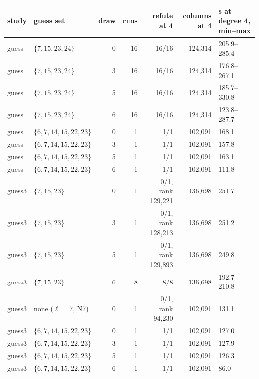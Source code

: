 \begin{tabular}{@{}llrrrrl@{}}
\toprule
study & guess set & draw & runs & refute at 4 & columns at 4 & s at degree 4, min--max \\
\midrule
guess & $\{7,15,23,24\}$ & 0 & 16 & 16/16 & 124{,}314 & 205.9--285.4 \\
guess & $\{7,15,23,24\}$ & 3 & 16 & 16/16 & 124{,}314 & 176.8--267.1 \\
guess & $\{7,15,23,24\}$ & 5 & 16 & 16/16 & 124{,}314 & 185.7--330.8 \\
guess & $\{7,15,23,24\}$ & 6 & 16 & 16/16 & 124{,}314 & 123.8--287.7 \\
guess & $\{6,7,14,15,22,23\}$ & 0 & 1 & 1/1 & 102{,}091 & 168.1 \\
guess & $\{6,7,14,15,22,23\}$ & 3 & 1 & 1/1 & 102{,}091 & 157.8 \\
guess & $\{6,7,14,15,22,23\}$ & 5 & 1 & 1/1 & 102{,}091 & 163.1 \\
guess & $\{6,7,14,15,22,23\}$ & 6 & 1 & 1/1 & 102{,}091 & 111.8 \\
guess3 & $\{7,15,23\}$ & 0 & 1 & 0/1, rank 129{,}221 & 136{,}698 & 251.7 \\
guess3 & $\{7,15,23\}$ & 3 & 1 & 0/1, rank 128{,}213 & 136{,}698 & 251.2 \\
guess3 & $\{7,15,23\}$ & 5 & 1 & 0/1, rank 129{,}893 & 136{,}698 & 249.8 \\
guess3 & $\{7,15,23\}$ & 6 & 8 & 8/8 & 136{,}698 & 192.7--210.8 \\
guess3 & none ($\ell=7$, N7) & 0 & 1 & 0/1, rank 94{,}230 & 102{,}091 & 131.1 \\
guess3 & $\{6,7,14,15,22,23\}$ & 0 & 1 & 1/1 & 102{,}091 & 127.0 \\
guess3 & $\{6,7,14,15,22,23\}$ & 3 & 1 & 1/1 & 102{,}091 & 127.9 \\
guess3 & $\{6,7,14,15,22,23\}$ & 5 & 1 & 1/1 & 102{,}091 & 126.3 \\
guess3 & $\{6,7,14,15,22,23\}$ & 6 & 1 & 1/1 & 102{,}091 & 86.0 \\
\bottomrule
\end{tabular}
